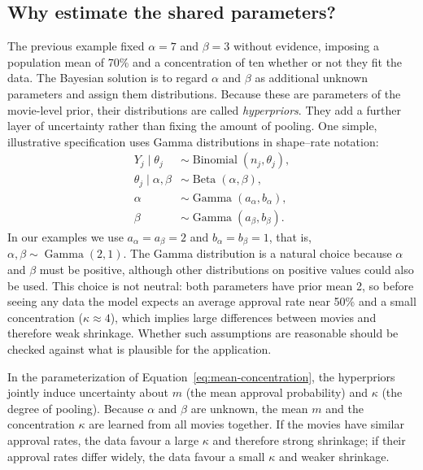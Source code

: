\documentclass[11pt,a4paper]{article}
\newcommand{\BetaD}{\operatorname{Beta}}
\newcommand{\Bin}{\operatorname{Binomial}}
\newcommand{\Gam}{\operatorname{Gamma}}
\begin{document}
\subsection{Why estimate the shared parameters?}
The previous example fixed $\alpha=7$ and $\beta=3$ without evidence, imposing a population mean of 70\% and a concentration of ten whether or not they fit the data. The Bayesian solution is to regard $\alpha$ and $\beta$ as additional unknown parameters and assign them distributions. Because these are parameters of the movie-level prior, their distributions are called \emph{hyperpriors}. They add a further layer of uncertainty rather than fixing the amount of pooling. One simple, illustrative specification uses Gamma distributions in shape--rate notation:
\begin{equation}
 \boxed{\begin{aligned}
 Y_j\mid\theta_j&\sim\Bin(n_j,\theta_j),\\
 \theta_j\mid\alpha,\beta&\sim\BetaD(\alpha,\beta),\\
 \alpha&\sim\Gam(a_\alpha,b_\alpha),\\
 \beta&\sim\Gam(a_\beta,b_\beta).
 \end{aligned}}
 \label{eq:full-hierarchy}
\end{equation}
In our examples we use $a_\alpha=a_\beta=2$ and $b_\alpha=b_\beta=1$, that is, $\alpha,\beta\sim\Gam(2,1)$. The Gamma distribution is a natural choice because $\alpha$ and $\beta$ must be positive, although other distributions on positive values could also be used. This choice is not neutral: both parameters have prior mean 2, so before seeing any data the model expects an average approval rate near 50\% and a small concentration ($\kappa\approx4$), which implies large differences between movies and therefore weak shrinkage. Whether such assumptions are reasonable should be checked against what is plausible for the application.

In the parameterization of Equation~\eqref{eq:mean-concentration}, the hyperpriors jointly induce uncertainty about $m$ (the mean approval probability) and $\kappa$ (the degree of pooling). Because $\alpha$ and $\beta$ are unknown, the mean $m$ and the concentration $\kappa$ are learned from all movies together. If the movies have similar approval rates, the data favour a large $\kappa$ and therefore strong shrinkage; if their approval rates differ widely, the data favour a small $\kappa$ and weaker shrinkage.
\end{document}
